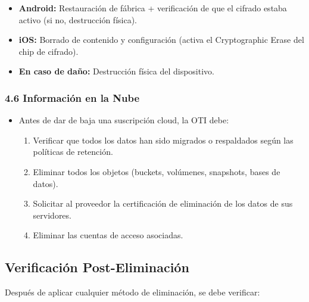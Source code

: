 \documentclass[10pt,letterpaper]{article}
\begin{document}
\begin{itemize}
\tightlist
\item
  \textbf{Android:} Restauración de fábrica + verificación de que el
  cifrado estaba activo (si no, destrucción física).
\item
  \textbf{iOS:} Borrado de contenido y configuración (activa el
  Cryptographic Erase del chip de cifrado).
\item
  \textbf{En caso de daño:} Destrucción física del dispositivo.
\end{itemize}

\subsubsection{4.6 Información en la
Nube}\label{informaciuxf3n-en-la-nube}

\begin{itemize}
\tightlist
\item
  Antes de dar de baja una suscripción cloud, la OTI debe:

  \begin{enumerate}
  \def\labelenumi{\arabic{enumi}.}
  \tightlist
  \item
    Verificar que todos los datos han sido migrados o respaldados según
    las políticas de retención.
  \item
    Eliminar todos los objetos (buckets, volúmenes, snapshots, bases de
    datos).
  \item
    Solicitar al proveedor la certificación de eliminación de los datos
    de sus servidores.
  \item
    Eliminar las cuentas de acceso asociadas.
  \end{enumerate}
\end{itemize}

\subsection{Verificación
Post-Eliminación}\label{verificaciuxf3n-post-eliminaciuxf3n}

Después de aplicar cualquier método de eliminación, se debe verificar:
\end{document}
